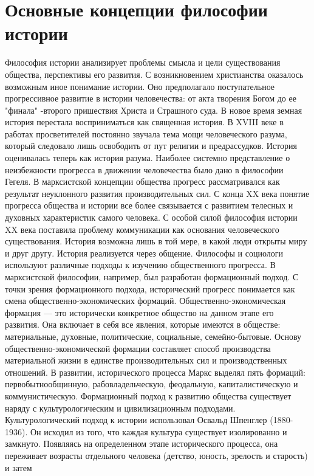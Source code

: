\documentclass[12pt]{article}
\begin{document}
\newpage
\section{Основные концепции философии истории}
Философия истории анализирует проблемы смысла и цели существования общества, перспективы его развития.
С  возникновением  христианства  оказалось  возможным  иное  понимание  истории.  Оно  предполагало
поступательное прогрессивное развитие в истории человечества: от акта творения Богом до ее "финала" -второго пришествия Христа и Страшного суда. В новое время земная история перестала восприниматься как
священная история. В XVIII веке в работах просветителей постоянно звучала тема мощи человеческого разума,
который следовало лишь освободить от пут религии и предрассудков. История оценивалась теперь как история
разума. Наиболее системно представление о неизбежности прогресса в движении человечества было дано в
философии Гегеля. В марксистской концепции общества прогресс рассматривался как результат неуклонного
развития производительных сил. С конца XX века понятие прогресса общества и истории все более связывается
с развитием телесных и духовных характеристик самого человека. С особой силой философия истории XX века
поставила проблему коммуникации как основания человеческого существования. История возможна лишь в той
мере, в какой люди открыты миру и друг другу. История реализуется через общение.
Философы и социологи используют различные подходы к изучению общественного прогресса. В марксистской
философии,  например,  был  разработан  формационный  подход.  С  точки  зрения  формационного  подхода,
исторический  прогресс  понимается  как  смена  общественно-экономических  формаций.  Общественно-экономическая формация --- это исторически конкретное общество на данном этапе его развития. Она включает в  
себя все явления, которые имеются в обществе: материальные, духовные, политические, социальные, семейно-бытовые. Основу общественно-экономической формации составляет способ производства материальной жизни
в единстве производительных сил и производственных отношений. В развитии, исторического процесса Маркс
выделял  пять  формаций:  первобытнообщинную,  рабовладельческую,  феодальную,  капиталистическую  и
коммунистическую. Формационный подход к развитию общества существует наряду с культурологическим и
цивилизационным подходами.
Культурологический подход к истории использовал Освальд Шпенглер (1880-1936). Он исходил из того, что
каждая  культура  существует  изолированно  и  замкнуто.  Появляясь  на  определенном  этапе  исторического
процесса,  она  переживает  возрасты  отдельного  человека  (детство,  юность,  зрелость  и  старость)  и  затем
\end{document}
